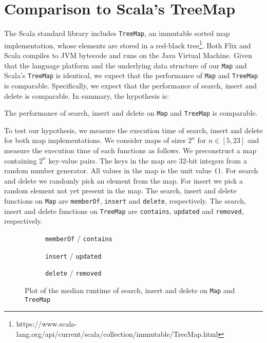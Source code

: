 \documentclass[../main.tex]{subfiles}
\begin{document}
\section{Comparison to Scala's TreeMap} \label{comparison-to-scalas-treemap}

The Scala standard library includes \lstinline{TreeMap}, an immutable sorted map implementation, whose elements are stored in a red-black tree\footnote{https://www.scala-lang.org/api/current/scala/collection/immutable/TreeMap.html}. Both Flix and Scala compiles to JVM bytecode and runs on the Java Virtual Machine. Given that the language platform and the underlying data structure of our \lstinline{Map} and Scala's \lstinline{TreeMap} is identical, we expect that the performance of \lstinline{Map} and \lstinline{TreeMap} is comparable. Specifically, we expect that the performance of search, insert and delete is comparable. In summary, the hypothesis is:
\begin{hypothesis}
The performance of search, insert and delete on \lstinline{Map} and \lstinline{TreeMap} is comparable.
\end{hypothesis}

To test our hypothesis, we measure the execution time of search, insert and delete for both map implementations. We consider maps of sizes $2^n$ for $n \in [5, 23]$ and measure the execution time of each functions as follows. We preconstruct a map containing $2^n$ key-value pairs. The keys in the map are 32-bit integers from a random number generator. All values in the map is the unit value \lstinline{()}. For search and delete we randomly pick an element from the map. For insert we pick a random element not yet present in the map. The search, insert and delete functions on \lstinline{Map} are \lstinline{memberOf}, \lstinline{insert} and \lstinline{delete}, respectively. The search, insert and delete functions on \lstinline{TreeMap} are \lstinline{contains}, \lstinline{updated} and \lstinline{removed}, respectively.

\begin{figure}[H]
  \pgfplotsset{width=\linewidth}
  \centering
  \begin{subfigure}[c]{0.495\textwidth}
  
  \caption{\lstinline{memberOf} / \lstinline{contains}}
  \label{map-scala-treemap-search-plot}
  \end{subfigure}
  \hfill
  \begin{subfigure}[c]{0.495\textwidth}
  
  \caption{\lstinline{insert} / \lstinline{updated}}
  \label{map-scala-treemap-insert-plot}
  \end{subfigure}
  \begin{subfigure}[c]{0.495\textwidth}
  
  \caption{\lstinline{delete} / \lstinline{removed}}
  \label{map-scala-treemap-delete-plot}
  \end{subfigure}
  \caption{Plot of the median \textsf{runtime} of search, insert and delete on \lstinline{Map} and \lstinline{TreeMap}}
\end{figure}
\end{document}
